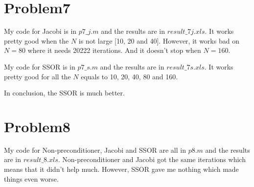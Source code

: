 \documentclass[11pt]{article}
\begin{document}
	\section{Problem7}
	\par My code for Jacobi is in $p7\mbox{\_}j.m$ and the results are in $result\mbox{\_}7j.xls$. It works pretty good when the $N$ is not large [10, 20 and 40]. However, it works bad on $N = 80$ where it needs 20222 iterations. And it doesn't stop when $N = 160$.
	\par My code for SSOR is in $p7\mbox{\_}s.m$ and the results are in $result\mbox{\_}7s.xls$. It works pretty good for all the $N$ equals to 10, 20, 40, 80 and 160. 
	\par In conclusion, the SSOR is much better.
	
	\section{Problem8}
	\par My code for Non-preconditioner, Jacobi and SSOR are all in $p8.m$ and the results are in $result\mbox{\_}8.xls$. Non-preconditioner and Jacobi got the same iterations which means that it didn't help much. However, SSOR gave me nothing which made things even worse.
\end{document}
